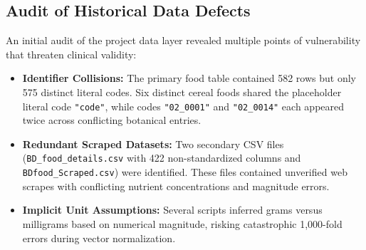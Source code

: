 \documentclass[5p,times,twocolumn]{elsarticle}
\begin{document}
\subsection{Audit of Historical Data Defects}
An initial audit of the project data layer revealed multiple points of vulnerability that threaten clinical validity:
\begin{itemize}[leftmargin=*,itemsep=1.5pt]
  \item \textbf{Identifier Collisions:} The primary food table contained 582 rows but only 575 distinct literal codes. Six distinct cereal foods shared the placeholder literal code \texttt{"code"}, while codes \texttt{"02\_0001"} and \texttt{"02\_0014"} each appeared twice across conflicting botanical entries.
  \item \textbf{Redundant Scraped Datasets:} Two secondary CSV files (\texttt{BD\_food\_details.csv} with 422 non-standardized columns and \texttt{BDfood\_Scraped.csv}) were identified. These files contained unverified web scrapes with conflicting nutrient concentrations and magnitude errors.
  \item \textbf{Implicit Unit Assumptions:} Several scripts inferred grams versus milligrams based on numerical magnitude, risking catastrophic 1,000-fold errors during vector normalization.
\end{itemize}
\end{document}
